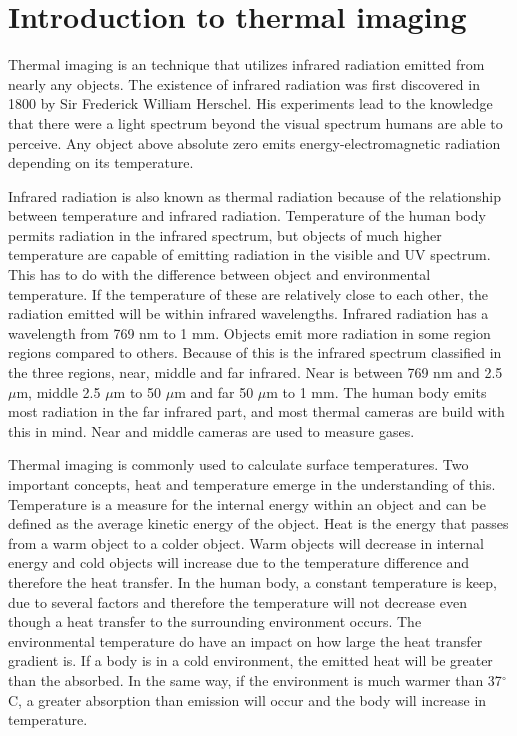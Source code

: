 \section{Introduction to thermal imaging}

Thermal imaging is an technique that utilizes infrared radiation emitted from nearly any objects. 
The existence of infrared radiation was first discovered in 1800 by Sir Frederick William Herschel. 
His experiments lead to the knowledge that there were a light spectrum beyond the visual spectrum humans are able to perceive. Any object above absolute zero emits energy-electromagnetic radiation depending on its temperature.\cite{ignacio2017,optris2009}

Infrared radiation is also known as thermal radiation because of the relationship between temperature and infrared radiation. Temperature of the human body permits radiation in the infrared spectrum, but objects of much higher temperature are capable of emitting radiation in the visible and UV spectrum. This has to do with the difference between object and environmental temperature. If the temperature of these are relatively close to each other, the radiation emitted will be within infrared wavelengths. Infrared radiation has a wavelength from 769 nm to 1 mm. Objects emit more radiation in some region regions compared to others. Because of this is the infrared spectrum classified in the three regions, near, middle and far infrared. Near is between 769 nm and 2.5 $\mu$m, middle 2.5 $\mu$m to 50 $\mu$m and far 50 $\mu$m to 1 mm. The human body emits most radiation in the far infrared part, and most thermal cameras are build with this in mind. Near and middle cameras are used to measure gases.\cite{ignacio2017}

Thermal imaging is commonly used to calculate surface temperatures. Two important concepts, heat and temperature emerge in the understanding of this. Temperature is a measure for the internal energy within an object and can be defined as the average kinetic energy of the object.
Heat is the energy that passes from a warm object to a colder object. Warm objects will decrease in internal energy and cold objects will increase due to the temperature difference and therefore the heat transfer. In the human body, a constant temperature is keep, due to several factors and therefore the temperature will not decrease even though a heat transfer to the surrounding environment occurs. The environmental temperature do have an impact on how large the heat transfer gradient is. If a body is in a cold environment, the emitted heat will be greater than the absorbed. In the same way, if the environment is much warmer than 37$^{\circ}$C, a greater absorption than emission will occur and the body will increase in temperature.\cite{ignacio2017} 

